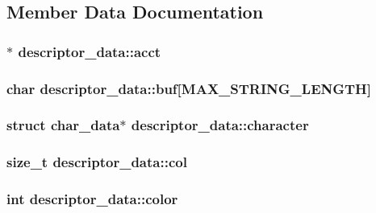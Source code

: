 \subsection{Member Data Documentation}
\hypertarget{structdescriptor__data_a1224d9582f87f982f8a763104818f777}{
\subsubsection[{acct}]{$\ast$ descriptor\-\_\-data\-::acct}}\label{structdescriptor__data_a1224d9582f87f982f8a763104818f777}
\hypertarget{structdescriptor__data_ac2c42749928a0918eb951a0195190b88}{
\subsubsection[{buf}]{\setlength{\rightskip}{0pt plus 5cm}char descriptor\-\_\-data\-::buf\mbox{[}{\bf M\-A\-X\-\_\-\-S\-T\-R\-I\-N\-G\-\_\-\-L\-E\-N\-G\-T\-H}\mbox{]}}}\label{structdescriptor__data_ac2c42749928a0918eb951a0195190b88}
\hypertarget{structdescriptor__data_afd72c30c44cbc32e839e8a2924081d98}{
\subsubsection[{character}]{\setlength{\rightskip}{0pt plus 5cm}struct {\bf char\-\_\-data}$\ast$ descriptor\-\_\-data\-::character}}\label{structdescriptor__data_afd72c30c44cbc32e839e8a2924081d98}
\hypertarget{structdescriptor__data_aba74a84b3bad7387b9b5e3bf241ba015}{
\subsubsection[{col}]{\setlength{\rightskip}{0pt plus 5cm}size\-\_\-t descriptor\-\_\-data\-::col}}\label{structdescriptor__data_aba74a84b3bad7387b9b5e3bf241ba015}
\hypertarget{structdescriptor__data_a34a2bfdbe6e2cdb52bad91413c9e7a67}{
\subsubsection[{color}]{\setlength{\rightskip}{0pt plus 5cm}int descriptor\-\_\-data\-::color}}\label{structdescriptor__data_a34a2bfdbe6e2cdb52bad91413c9e7a67}
